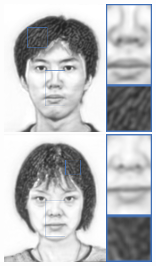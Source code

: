 \documentclass[10pt,twocolumn,letterpaper]{article}
\begin{document}
\begin{figure}[htbp]
{\begin{minipage}[b]{0.13\linewidth}
\includegraphics[width=0.99\linewidth]{img/sketch_result/bfcn_s1.png}
\includegraphics[width=0.99\linewidth]{img/sketch_result/bfcn_s2.png}

\end{minipage}}
\end{figure}
\end{document}

